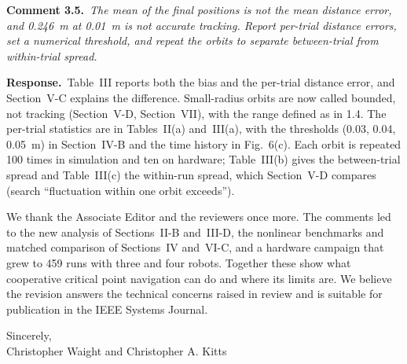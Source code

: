 \documentclass[10pt]{article}
\newcommand{\rev}[1]{#1}                             %
\newcommand{\cmt}[2]{\textbf{Comment #1.}~\textit{#2}\par}
\newcommand{\resp}{\par\textbf{Response.}~}
\begin{document}
\cmt{3.5}{The mean of the final positions is not the mean distance error, and 0.246~m at 0.01~m is not accurate tracking. Report per-trial distance errors, set a numerical threshold, and repeat the orbits to separate between-trial from within-trial spread.}

\resp Table~III reports both the bias and the per-trial distance error, and Section~V-C explains the difference. Small-radius orbits are now called bounded, not tracking (Section~V-D, Section~VII), with the range defined as in 1.4. The per-trial statistics are in Tables~II(a) and~III(a), with the thresholds (0.03, 0.04, 0.05~m) in Section~IV-B and the time history in \rev{Fig.~6(c)}. Each orbit is repeated \rev{100} times in simulation and \rev{ten} on hardware; Table~III(b) gives the between-trial spread and Table~III(c) the within-run spread, which Section~V-D compares (search ``fluctuation within one orbit exceeds'').

\vspace{10pt}
We thank the Associate Editor and the reviewers once more. The comments led to the new analysis of Sections~II-B and~III-D, the nonlinear benchmarks and matched comparison of Sections~IV and~VI-C, and a hardware campaign that grew to \rev{459} runs with three and four robots. Together these show what cooperative critical point navigation can do and where its limits are. We believe the revision answers the technical concerns raised in review and is suitable for publication in the IEEE Systems Journal.

Sincerely,\\
Christopher Waight and Christopher A. Kitts
\end{document}
